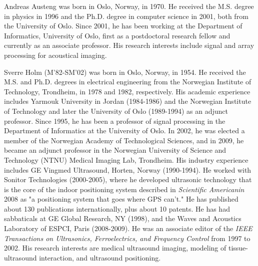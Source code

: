 \documentclass[journal]{IEEEtran}
\begin{document}

\begin{IEEEbiography}{Andreas Austeng}
was born in Oslo, Norway, in 1970. He received the M.S. degree in physics in 1996 and the Ph.D. degree in computer science in 2001, both from the University of Oslo. Since 2001, he has been working at the Department of Informatics, University of Oslo, first as a postdoctoral research fellow and currently as an associate professor. His research interests include signal and array processing for acoustical imaging.
\end{IEEEbiography}


\begin{IEEEbiography}{Sverre Holm}
(M’82-SM’02) was born in Oslo, Norway, in 1954. He received the M.S. and Ph.D. degrees in electrical engineering from the Norwegian Institute of Technology, Trondheim, in 1978 and 1982, respectively. His academic experience includes Yarmouk University in Jordan (1984-1986) and the Norwegian Institute of Technology and later the University of Oslo (1989-1994) as an adjunct professor. Since 1995, he has been a professor of signal processing in the Department of Informatics at the University of Oslo. In 2002, he was elected a member of the Norwegian Academy of Technological Sciences, and in 2009, he became an adjunct professor in the Norwegian University of Science and Technology (NTNU) Medical Imaging Lab, Trondheim. His industry experience includes GE Vingmed Ultrasound, Horten, Norway (1990-1994). He worked with Sonitor Technologies (2000-2005), where he developed ultrasonic technology that is the core of the indoor positioning system described in \textit{Scientific Americanin} 2008 as "a positioning system that goes where GPS can't." He has published about 130 publications internationally, plus about 10 patents. He has had sabbaticals at GE Global Research, NY (1998), and the Waves and 
Acoustics Laboratory of ESPCI, Paris (2008-2009). He was an associate editor of the \textit{IEEE Transactions on Ultrasonics, Ferroelectrics, and Frequency Control} from 1997 to 2002. His research interests are medical ultrasound imaging, modeling of tissue-ultrasound interaction, and ultrasound positioning.
\end{IEEEbiography}
\end{document}
